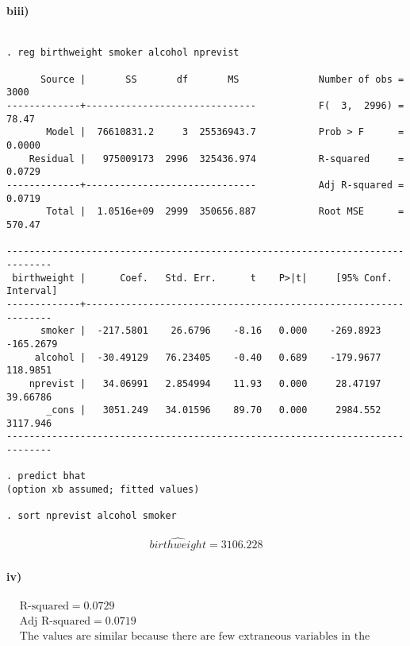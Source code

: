 \documentclass[letterpaper,12pt,titlepage,oneside,final]{book}
\begin{document}
\paragraph{biii)}
\begin{verbatim}

. reg birthweight smoker alcohol nprevist

      Source |       SS       df       MS              Number of obs =    3000
-------------+------------------------------           F(  3,  2996) =   78.47
       Model |  76610831.2     3  25536943.7           Prob > F      =  0.0000
    Residual |   975009173  2996  325436.974           R-squared     =  0.0729
-------------+------------------------------           Adj R-squared =  0.0719
       Total |  1.0516e+09  2999  350656.887           Root MSE      =  570.47

------------------------------------------------------------------------------
 birthweight |      Coef.   Std. Err.      t    P>|t|     [95% Conf. Interval]
-------------+----------------------------------------------------------------
      smoker |  -217.5801    26.6796    -8.16   0.000    -269.8923   -165.2679
     alcohol |  -30.49129   76.23405    -0.40   0.689    -179.9677    118.9851
    nprevist |   34.06991   2.854994    11.93   0.000     28.47197    39.66786
       _cons |   3051.249   34.01596    89.70   0.000     2984.552    3117.946
------------------------------------------------------------------------------

. predict bhat
(option xb assumed; fitted values)

. sort nprevist alcohol smoker

\end{verbatim}
\begin{align*}
\widehat{birthweight}=3106.228
\end{align*}
\paragraph{iv)}
\begin{align*}
 &\text{R-squared}     =  0.0729\\
 &\text{Adj R-squared} =  0.0719 \\
 &\text{The values are similar because there are few extraneous variables in the model.}
\end{align*}
\end{document}
